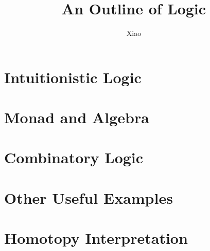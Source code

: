 \documentclass[12pt,a4paper]{report}
\begin{document}
\title{An Outline of Logic}
\author{Xiao}
\date{}
\maketitle

\tableofcontents




\chapter{Intuitionistic Logic}
\label{intuitionistic-logic}

\chapter{Monad and Algebra}
\label{monad-algebra}

\chapter{Combinatory Logic}
\label{combinatory-logic}

\chapter{Other Useful Examples}
\label{monad-examples}

\chapter{Homotopy Interpretation}
\label{HoTT}



\end{document}
